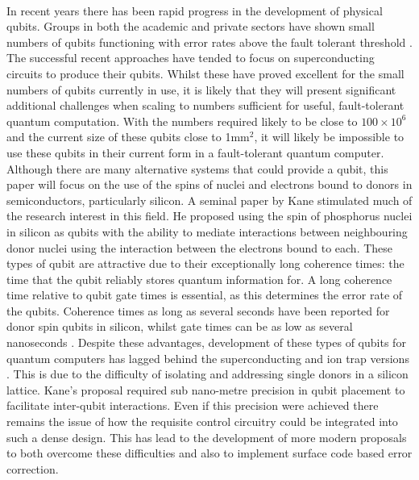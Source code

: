 \\
In recent years there has been rapid progress in the development of physical qubits.
Groups in both the academic and private sectors have shown small numbers of qubits functioning with error rates above the fault tolerant threshold \cite{Barends2015,Reagor2017}.
The successful recent approaches have tended to focus on superconducting circuits to produce their qubits.
Whilst these have proved excellent for the small numbers of qubits currently in use, it is likely that they will present significant additional challenges when scaling to numbers sufficient for useful, fault-tolerant quantum computation.
With the numbers required likely to be close to $100 \times 10^6$ and the current size of these qubits close to 1mm$^2$, it will likely be impossible to use these qubits in their current form in a fault-tolerant quantum computer.
\\
Although there are many alternative systems that could provide a qubit, this paper will focus on the use of the spins of nuclei and electrons bound to donors in semiconductors, particularly silicon.
A seminal paper by Kane \cite{Kane1998} stimulated much of the research interest in this field.
He proposed using the spin of phosphorus nuclei in silicon as qubits with the ability to mediate interactions between neighbouring donor nuclei using the interaction between the electrons bound to each.
These types of qubit are attractive due to their exceptionally long coherence times: the time that the qubit reliably stores quantum information for. 
A long coherence time relative to qubit gate times is essential, as this determines the error rate of the qubits.
Coherence times as long as several seconds have been reported for donor spin qubits in silicon, whilst gate times can be as low as several nanoseconds \cite{Wolfowicz2013}. 
Despite these advantages, development of these types of qubits for quantum computers has lagged behind the superconducting and ion trap versions \cite{Ballance2015}. 
This is due to the difficulty of isolating and addressing single donors in a silicon lattice. 
Kane's proposal required sub nano-metre precision in qubit placement to facilitate inter-qubit interactions. 
Even if this precision were achieved there remains the issue of how the requisite control circuitry could be integrated into such a dense design.
This has lead to the development of more modern proposals to both overcome these difficulties and also to implement surface code based error correction.
\\
\\
